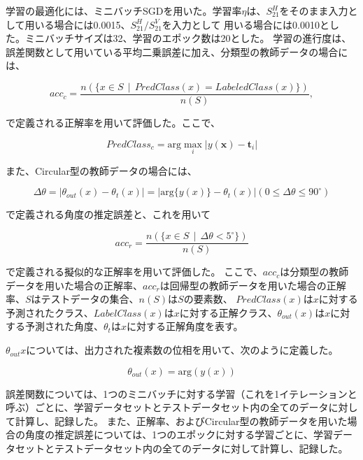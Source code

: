 \documentclass[11pt,a4paper,uplatex]{ujarticle}
\begin{document}
  学習の最適化には、ミニバッチSGDを用いた。学習率$\eta$は、$S_{21}^H$をそのまま入力として用いる場合には0.0015、$S_{21}^{H}/S_{21}^{V}$を入力として
  用いる場合には0.0010とした。ミニバッチサイズは32、学習のエポック数は20とした。
  学習の進行度は、誤差関数として用いている平均二乗誤差に加え、分類型の教師データの場合には、

  \begin{equation}
    acc_{c} = \frac{n(\{x \in S \, \mid\, PredClass(x) = LabeledClass(x)\})}{n(S)},
  \end{equation} %

  で定義される正解率を用いて評価した。ここで、

  \begin{equation}
    PredClass_{c} = \mathrm{arg}\max_{i} |y(\mathbf{x}) - \mathbf{t}_i|
  \end{equation} %
  
  また、Circular型の教師データの場合には、

  \begin{equation}
    \Delta\theta = |\theta_{out}(x) - \theta_{t}(x)| =  |\mathrm{arg}\{y(x)\}- \theta_{t}(x)| ( 0 \le \Delta\theta \le 90^{\circ})
  \end{equation} %

  で定義される角度の推定誤差と、これを用いて

  \begin{equation}
    acc_{r} = \frac{n(\{x \in S \, \mid\, \Delta\theta < 5^{\circ}\})}{n(S)}
  \end{equation} %

  で定義される擬似的な正解率を用いて評価した。
  ここで、$acc_c$は分類型の教師データを用いた場合の正解率、$acc_r$は回帰型の教師データを用いた場合の正解率、$S$はテストデータの集合、$n(S)$は$S$の要素数、
  $PredClass(x)$は$x$に対する予測されたクラス、$LabelClass(x)$は$x$に対する正解クラス、$\theta_{out}(x)$は$x$に対する予測された角度、$\theta_{t}$は$x$に対する正解角度を表す。

  $\theta_{out}{x}$については、出力された複素数の位相を用いて、次のように定義した。

  \begin{equation}
    \theta_{out}(x) = \mathrm{arg}(y(x))
  \end{equation} %

  誤差関数については、1つのミニバッチに対する学習（これを1イテレーションと呼ぶ）ごとに、学習データセットとテストデータセット内の全てのデータに対して計算し、記録した。
  また、正解率、およびCircular型の教師データを用いた場合の角度の推定誤差については、1つのエポックに対する学習ごとに、学習データセットとテストデータセット内の全てのデータに対して計算し、記録した。
\end{document}

